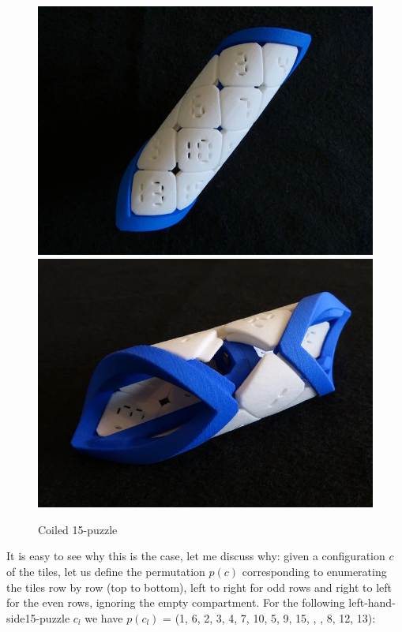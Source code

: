 \begin{figure}[H]
\centering
\includegraphics[scale=0.3]{./Figures/coiled15puzzle}
\includegraphics[scale=0.3]{./Figures/coiled15puzzle2.png}
\caption[Coiled 15-puzzle]{Coiled 15-puzzle}
\end{figure}


\noindent It is easy to see why this is the case, let me discuss why: given a configuration $c$ of the tiles, let us define the permutation $p(c)$ corresponding to enumerating the tiles row by row (top to bottom), left to right for odd rows and right to left for the even rows, ignoring the empty compartment. For the following left-hand-side15-puzzle $c_{l}$ we have $p(c_{l})$ = (1, 6, 2, 3, 4, 7, 10, 5, 9, 15,  \black, , 8\black, 12, 13):

